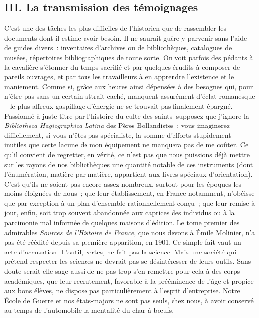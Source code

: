 \documentclass[french,twoside]{book} %
\begin{document}
\subsection[{III. La transmission des témoignages}]{III. La transmission des témoignages}
\noindent  {}
\label{p29} C’est une des tâches les plus difficiles de l’historien que de rassembler les documents dont il estime avoir besoin. Il ne saurait guère y parvenir sans l’aide de guides divers : inventaires d’archives ou de bibliothèques, catalogues de musées, répertoires bibliographiques de toute sorte. On voit parfois des pédants à la cavalière s’étonner du temps sacrifié et par quelques érudits à composer de pareils ouvrages, et par tous les travailleurs à en apprendre l’existence et le maniement. Comme si, grâce aux heures ainsi dépensées à des besognes qui, pour n’être pas sans un certain attrait caché, manquent assurément d’éclat romanesque – le plus affreux gas­pillage d’énergie ne se trouvait pas finalement épargné. Passionné à juste titre par l’histoire du culte des saints, supposez que j’ignore la \emph{Bibliotheca Hagiographica Latina} des Pères Bollandistes : vous imaginerez difficile­ment, si vous n’êtes pas spécialiste, la somme d’efforts stupidement inutiles que cette lacune de mon équipement ne manquera pas de me coûter. Ce qu’il convient de regretter, en vérité, ce n’est pas que nous puissions déjà mettre sur les rayons de nos bibliothèques une quantité notable de ces instruments (dont l’énumération, matière par matière, appartient aux livres spéciaux d’orientation). C’est qu’ils ne soient pas encore assez nombreux, surtout pour les époques les moins éloignées de nous ; que leur établissement, en France notamment, n’obéisse que par exception à un plan d’ensemble rationnellement conçu ; que leur remise à jour, enfin, soit trop souvent abandonnée aux caprices des individus ou à la parcimonie mal informée de quelques maisons d’édition. Le tome premier des admirables \emph{Sources de l’Histoire de France}, que nous devons à Émile Molinier, n’a pas été réédité depuis sa première apparition, en 1901. Ce simple fait vaut un acte d’accusation. L’outil, certes, ne fait pas la science. Mais une société qui prétend respecter les sciences ne devrait pas se désintéresser de leurs outils. Sans doute serait‑elle sage aussi de ne pas trop s’en remettre pour cela à des corps académiques, que leur recrutement, favorable à la prééminence de l’âge et propice aux bons élèves, ne dispose pas particulièrement à l’esprit d’entreprise. Notre École de Guerre et nos états‑majors ne sont pas seuls, chez nous, à avoir conservé au temps de l’automobile la mentalité du char à bœufs.\par
\end{document}
